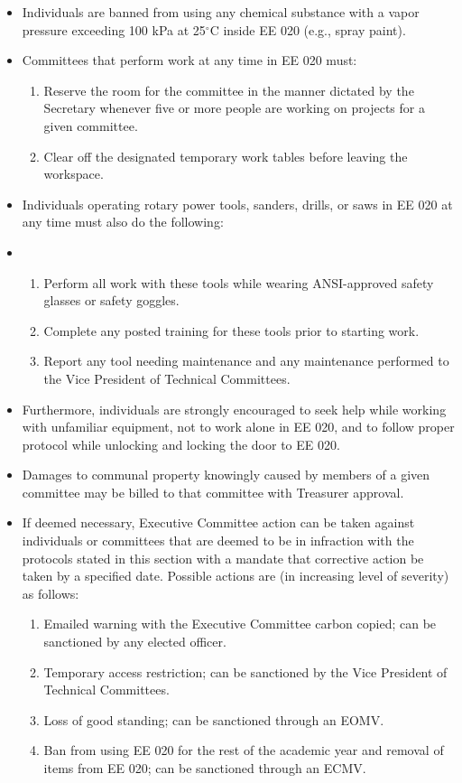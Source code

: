\documentclass[12pt]{constitution}
\begin{document}
\begin{itemize}
\begin{enumerate}
\begin{itemize}
        \end{itemize}
    \end{enumerate}
    \item Individuals are banned from using any chemical substance with a vapor pressure exceeding 100 kPa at 25$^{\circ}$C inside EE 020 (e.g., spray paint).
    \item Committees that perform work at any time in EE 020 must:
    \begin{enumerate}
        \item Reserve the room for the committee in the manner dictated by the Secretary whenever five or more people are working on projects for a given committee.
        \item Clear off the designated temporary work tables before leaving the workspace.
    \end{enumerate}
    \item Individuals operating rotary power tools, sanders, drills, or saws in EE 020 at any time must also do the following:
    \item
    \begin{enumerate}
        \item Perform all work with these tools while wearing ANSI-approved safety glasses or safety goggles.
        \item Complete any posted training for these tools prior to starting work.
        \item Report any tool needing maintenance and any maintenance performed to the Vice President of Technical Committees.
    \end{enumerate}
    \item Furthermore, individuals are strongly encouraged to seek help while working with unfamiliar equipment, not to work alone in EE 020, and to follow proper protocol while unlocking and locking the door to EE 020.
    \item Damages to communal property knowingly caused by members of a given committee may be billed to that committee with Treasurer approval.
    \item If deemed necessary, Executive Committee action can be taken against individuals or committees that are deemed to be in infraction with the protocols stated in this section with a mandate that corrective action be taken by a specified date. Possible actions are (in increasing level of severity) as follows:
    \begin{enumerate}
        \item Emailed warning with the Executive Committee carbon copied; can be sanctioned by any elected officer.
        \item Temporary access restriction; can be sanctioned by the Vice President of Technical Committees.
        \item Loss of good standing; can be sanctioned through an EOMV.
        \item Ban from using EE 020 for the rest of the academic year and removal of items from EE 020; can be sanctioned through an ECMV.
    \end{enumerate}
\end{itemize}
\end{document}

